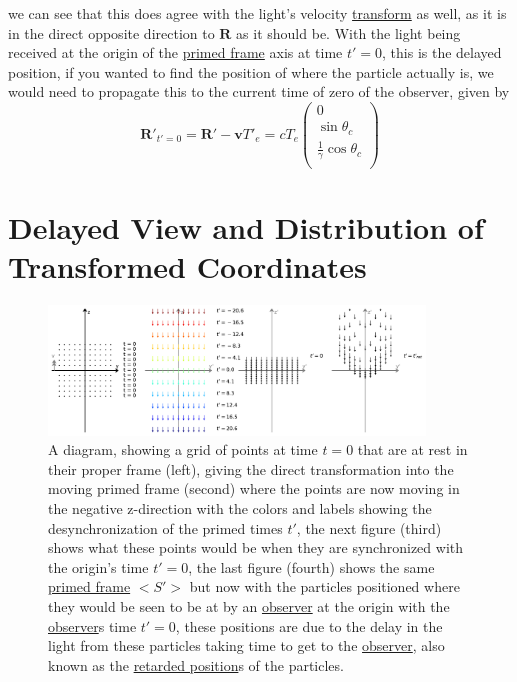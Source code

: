 we can see that this does agree with the light's velocity \hyperlink{def-transform}{transform} as well, as it is in the direct opposite direction to $\mathbf{R}$ as it should be. With the light being received at the origin of the \hyperlink{def-Primed-Frame}{primed frame} axis at time $t'=0$, this is the delayed position, if you wanted to find the position of where the particle actually is, we would need to propagate this to the current time of zero of the observer, given by
\begin{equation}
	\mathbf{R}'_{t'=0} = \mathbf{R}' - \mathbf{v}T'_{e} = cT_{e}
	\begin{pmatrix}
		0
		\\ \sin{\theta_c}
		\\ \frac{1}{\gamma}  \cos{\theta_c}
		\\
	\end{pmatrix}
\end{equation}

\section{Delayed View and Distribution of Transformed Coordinates}

\begin{figure}[H]
	\centering
	\includegraphics[width=10cm]{images/pdf/coordinate_transforms_2.pdf}
	\caption{A diagram, showing a grid of points at time $t=0$ that are at rest in their proper frame (left), giving the direct transformation into the moving primed frame (second) where the points are now moving in the negative z-direction with the colors and labels showing the desynchronization of the primed times $t'$, the next figure (third) shows what these points would be when they are synchronized with the origin's time $t'=0$, the last figure (fourth) shows the same \protect\hyperlink{def-Primed-Frame}{primed frame} $<S'>$ but now with the particles positioned where they would be seen to be at by an \protect\hyperlink{def-observer}{observer} at the origin with the \protect\hyperlink{def-observer}{observer}s time $t'=0$, these positions are due to the delay in the light from these particles taking time to get to the \protect\hyperlink{def-observer}{observer}, also known as the \protect\hyperlink{def-retarded-position}{retarded position}s of the particles.}
	\label{fig: full coordinate transform}
\end{figure}

